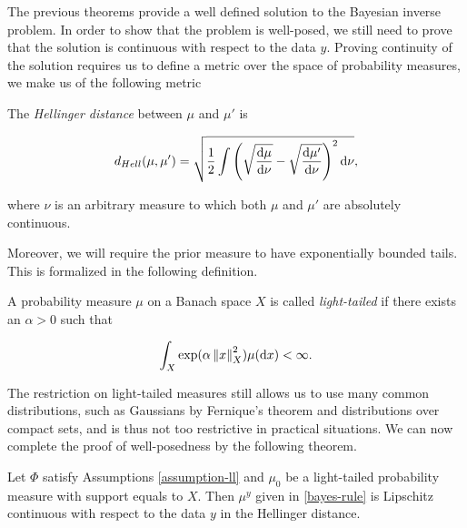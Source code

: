 The previous theorems provide a well defined solution to the Bayesian inverse problem. In order to show that the problem is well-posed, we still need to prove that the solution is continuous with respect to the data $y$. Proving continuity of the solution requires us to define a metric over the space of probability measures, we make us of the following metric

\begin{definition} The \textit{Hellinger distance} between $\mu$ and $\mu'$ is

  \begin{equation*}
    d_{Hell}(\mu, \mu') = \sqrt{\frac12\int\left(\sqrt{\frac{\text{d} \mu}{\text{d} \nu}} - \sqrt{\frac{\text{d} \mu'}{\text{d} \nu}}\right)^2\text{d} \nu},
  \end{equation*}

  where $\nu$ is an arbitrary measure to which both $\mu$ and $\mu'$ are absolutely continuous.
\end{definition}

Moreover, we will require the prior measure to have exponentially bounded tails. This is formalized in the following definition.

\begin{definition}
  A probability measure $\mu$ on a Banach space $X$ is called \textit{light-tailed} if there exists an $\alpha > 0$ such that

  \begin{equation*}
    \int_X\exp(\alpha\left\lVert x\right\rVert^2_X)\mu(\text{d} x) < \infty.
  \end{equation*}
\end{definition}

The restriction on light-tailed measures still allows us to use many common distributions, such as Gaussians by Fernique's theorem and distributions over compact sets, and is thus not too restrictive in practical situations. We can now complete the proof of well-posedness by the following theorem.

\begin{theorem}
  Let $\Phi$ satisfy Assumptions \ref{assumption-ll} and $\mu_0$ be a light-tailed probability measure with support equals to $X$. Then $\mu^y$ given in \ref{bayes-rule} is Lipschitz continuous with respect to the data $y$ in the Hellinger distance.
\end{theorem}

